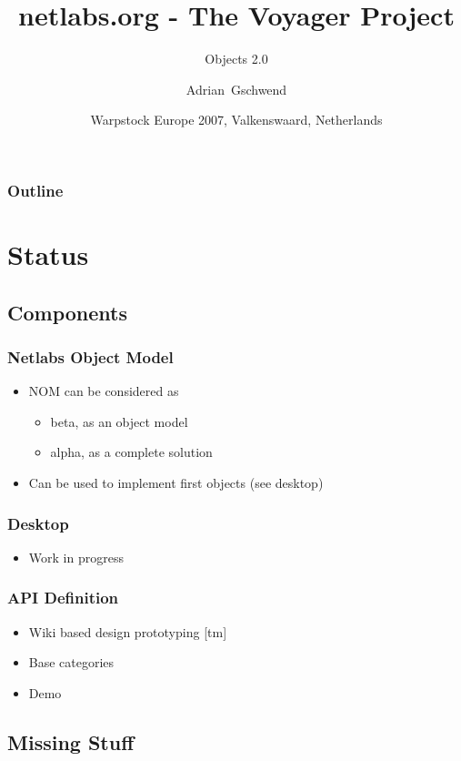 \documentclass[handout]{beamer}
\title[netlabs.org - The Voyager Project]
{netlabs.org - The Voyager Project}
\subtitle
{Objects 2.0}
\author[Adrian Gschwend]
{Adrian~Gschwend}
\institute[netlabs.org]
{
netlabs.org - Open Source Software
}
\date[3.11.2007]
{Warpstock Europe 2007, Valkenswaard, Netherlands}
\begin{document}
\begin{frame}
\titlepage
\end{frame}

\begin{frame}
\frametitle{Outline}
\tableofcontents[hideallsubsections]
\end{frame}

\section{Status}

\subsection{Components}

\begin{frame}
\frametitle{Netlabs Object Model}
\begin{itemize}[<+->]
  \item NOM can be considered as
  \begin{itemize}
    \item beta, as an object model
    \item alpha, as a complete solution 
  \end{itemize}  
  \item Can be used to implement first objects (see desktop)
\end{itemize}
\end{frame}

\begin{frame}
\frametitle{Desktop}
\begin{itemize}
  \item Work in progress
\end{itemize}
\end{frame}

\begin{frame}
\frametitle{API Definition}
\begin{itemize}[<+->]
  \item Wiki based design prototyping [tm]
  \item Base categories 
  \item Demo
\end{itemize}
\end{frame}


\subsection{Missing Stuff}
\end{document}
